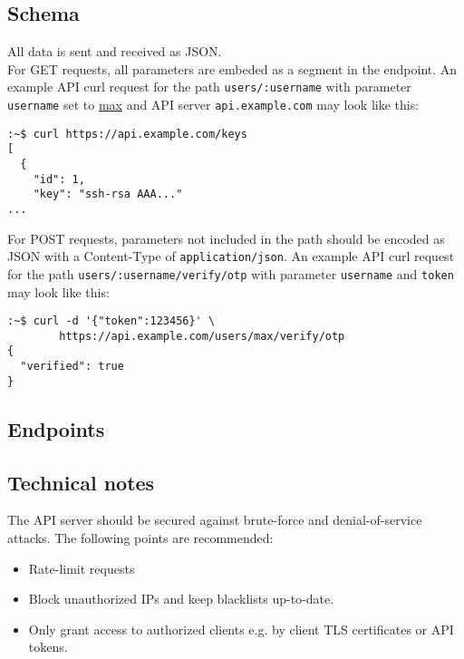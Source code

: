 \subsection{Schema}

All data is sent and received as JSON. \\

For GET requests, all parameters are embeded as a segment in the endpoint. An
example API curl request for the path \verb+users/:username+ with parameter
\verb+username+ set to \underline{max} and API server \verb+api.example.com+
may look like this:

\begin{lstlisting}[language=none, numbers=none]
:~$ curl https://api.example.com/keys
[
  {
    "id": 1,
    "key": "ssh-rsa AAA..."
...
\end{lstlisting}

For POST requests, parameters not included in the path should be encoded as JSON
with a Content-Type of \verb+application/json+. An example API curl request for
the path \verb+users/:username/verify/otp+ with parameter \verb+username+ and
\verb+token+ may look like this:

\begin{lstlisting}[language=none, numbers=none]
:~$ curl -d '{"token":123456}' \
        https://api.example.com/users/max/verify/otp
{
  "verified": true
}
\end{lstlisting}


\subsection{Endpoints}

\newcommand{\includeApiDefinition}[1]{
	\begin{minipage}{\textwidth}
	
	\end{minipage}
}


\includeApiDefinition{ssh_keys}
\includeApiDefinition{ssh_keys_notify}
\includeApiDefinition{verify_otp}


\subsection{Technical notes}

The API server should be secured against brute-force and denial-of-service
attacks. The following points are recommended:

\begin{itemize}
	\item Rate-limit requests
	\item Block unauthorized IPs and keep blacklists up-to-date.
	\item Only grant access to authorized clients e.g. by client TLS
		certificates or API tokens.
\end{itemize}

